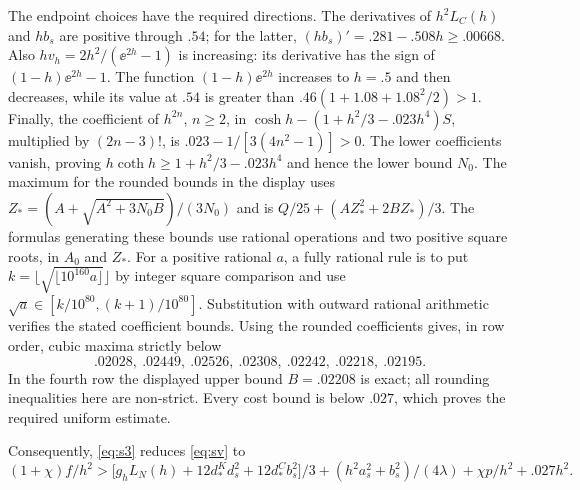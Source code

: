 The endpoint choices have the required directions. The derivatives of $h^2L_C(h)$ and $hb_s$ are positive through $.54$; for the latter, $(hb_s)'=.281-.508h\ge.00668$. Also $hv_h=2h^2/(\ee^{2h}-1)$ is increasing: its derivative has the sign of $(1-h)\ee^{2h}-1$. The function $(1-h)\ee^{2h}$ increases to $h=.5$ and then decreases, while its value at $.54$ is greater than $.46(1+1.08+1.08^2/2)>1$. Finally, the coefficient of $h^{2n}$, $n\ge2$, in $\cosh h-(1+h^2/3-.023h^4)S$, multiplied by $(2n-3)!$, is $.023-1/[3(4n^2-1)]>0$. The lower coefficients vanish, proving $h\coth h\ge1+h^2/3-.023h^4$ and hence the lower bound $N_0$. The maximum for the rounded bounds in the display uses $Z_*=(A+\sqrt{A^2+3N_0 B})/(3N_0)$ and is $Q/25+(A Z_*^2+2B Z_*)/3$. The formulas generating these bounds use rational operations and two positive square roots, in $A_0$ and $Z_*$. For a positive rational $a$, a fully rational rule is to put $k=\lfloor\sqrt{\lfloor10^{160}a\rfloor}\rfloor$ by integer square comparison and use $\sqrt a\in[k/10^{80},(k+1)/10^{80}]$. Substitution with outward rational arithmetic verifies the stated coefficient bounds. Using the rounded coefficients gives, in row order, cubic maxima strictly below
\[
 .02028,\ .02449,\ .02526,\ .02308,\ .02242,\ .02218,\ .02195.
\]
In the fourth row the displayed upper bound $B=.02208$ is exact; all rounding inequalities here are non-strict. Every cost bound is below $.027$, which proves the required uniform estimate.

Consequently, \eqref{eq:s3} reduces \eqref{eq:sv} to
\begin{equation}
 (1+\chi) f/h^2 >
 \big[g_h L_N(h)+12d_*^K d_s^2+12d_*^C b_s^2\big]/3+
 (h^2 a_s^2+b_s^2)/(4\lambda)+\chi p/h^2+.027h^2.                                 \tag{s5}\label{eq:s5}
\end{equation}

